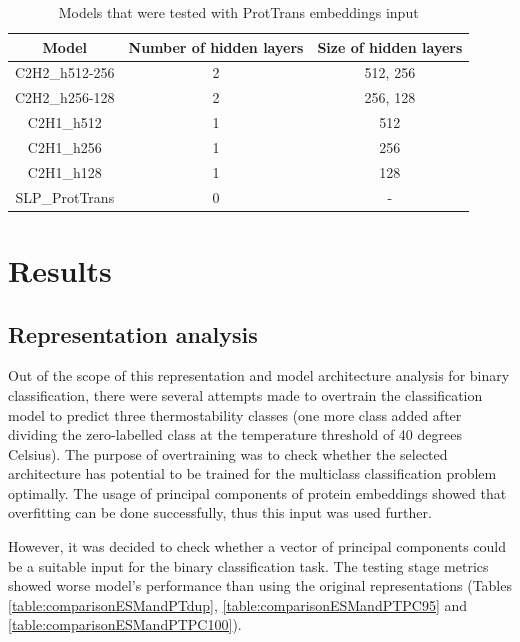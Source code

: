 \documentclass[12pt]{article}
\begin{document}
	\begin{table}[h!]
		\caption{Models that were tested with ProtTrans embeddings input}
		\vspace{0.2cm}
		\centering
		\begin{tabular}{ | c | c c | }
			\hline 
			Model & Number of hidden layers & Size of hidden layers \\
			\hline 
			C2H2\_h512-256 & 2 & 512, 256 \\
			C2H2\_h256-128 & 2 & 256, 128 \\
			C2H1\_h512 & 1 & 512 \\
			C2H1\_h256 & 1 & 256 \\
			C2H1\_h128 & 1 & 128 \\
			SLP\_ProtTrans & 0 & - \\
			\hline    
		\end{tabular}
		\label{table:modelArchitecturesPT}
	\end{table}

	\newpage

	\section{Results}

	\subsection{Representation analysis}

	Out of the scope of this representation and model architecture analysis
	for binary classification, there were several attempts made to overtrain
	the classification model to predict three thermostability classes (one 
	more class added after dividing the zero-labelled class at the temperature
	threshold of 40 degrees Celsius). The purpose of overtraining was to check 
	whether the selected architecture has potential to be trained for the 
	multiclass classification problem optimally. The usage of principal 
	components of protein embeddings showed that overfitting can be done successfully, 
	thus this input was used further. 

	However, it was decided to check whether 
	a vector of principal components could be a suitable input for the binary 
	classification task. The testing stage metrics showed worse model's performance 
	than using the original representations (Tables \ref{table:comparisonESMandPTdup}, 
	\ref{table:comparisonESMandPTPC95} and 
	\ref{table:comparisonESMandPTPC100}). 
\end{document}
